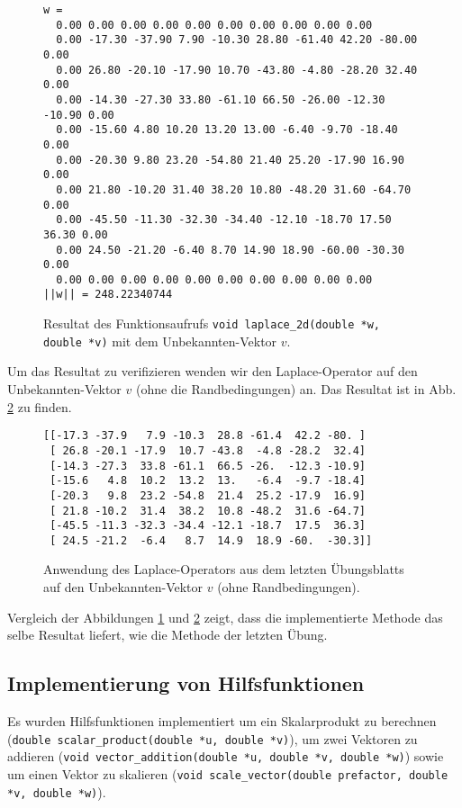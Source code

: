 \documentclass[10pt,a4paper]{article}
\begin{document}
\begin{figure}[H]
  \centering
\begin{verbatim}
w = 
  0.00 0.00 0.00 0.00 0.00 0.00 0.00 0.00 0.00 0.00 
  0.00 -17.30 -37.90 7.90 -10.30 28.80 -61.40 42.20 -80.00 0.00 
  0.00 26.80 -20.10 -17.90 10.70 -43.80 -4.80 -28.20 32.40 0.00 
  0.00 -14.30 -27.30 33.80 -61.10 66.50 -26.00 -12.30 -10.90 0.00 
  0.00 -15.60 4.80 10.20 13.20 13.00 -6.40 -9.70 -18.40 0.00 
  0.00 -20.30 9.80 23.20 -54.80 21.40 25.20 -17.90 16.90 0.00 
  0.00 21.80 -10.20 31.40 38.20 10.80 -48.20 31.60 -64.70 0.00 
  0.00 -45.50 -11.30 -32.30 -34.40 -12.10 -18.70 17.50 36.30 0.00 
  0.00 24.50 -21.20 -6.40 8.70 14.90 18.90 -60.00 -30.30 0.00 
  0.00 0.00 0.00 0.00 0.00 0.00 0.00 0.00 0.00 0.00 
||w|| = 248.22340744
\end{verbatim}
  \caption{Resultat des Funktionsaufrufs \texttt{void laplace\_2d(double *w,
  double *v)} mit dem Unbekannten-Vektor $v$.}
  \label{fig:w}
\end{figure}

Um das Resultat zu verifizieren wenden wir den Laplace-Operator auf den
Unbekannten-Vektor $v$ (ohne die Randbedingungen) an. Das Resultat ist in Abb.
\ref{fig:verify} zu finden.

\begin{figure}[H]
  \centering
\begin{verbatim}
[[-17.3 -37.9   7.9 -10.3  28.8 -61.4  42.2 -80. ]
 [ 26.8 -20.1 -17.9  10.7 -43.8  -4.8 -28.2  32.4]
 [-14.3 -27.3  33.8 -61.1  66.5 -26.  -12.3 -10.9]
 [-15.6   4.8  10.2  13.2  13.   -6.4  -9.7 -18.4]
 [-20.3   9.8  23.2 -54.8  21.4  25.2 -17.9  16.9]
 [ 21.8 -10.2  31.4  38.2  10.8 -48.2  31.6 -64.7]
 [-45.5 -11.3 -32.3 -34.4 -12.1 -18.7  17.5  36.3]
 [ 24.5 -21.2  -6.4   8.7  14.9  18.9 -60.  -30.3]]
\end{verbatim}
  \caption{Anwendung des Laplace-Operators aus dem letzten Übungsblatts auf den
    Unbekannten-Vektor $v$ (ohne Randbedingungen).}
  \label{fig:verify}
\end{figure}

Vergleich der Abbildungen \ref{fig:w} und \ref{fig:verify} zeigt, dass die
implementierte Methode das selbe Resultat liefert, wie die Methode der letzten
Übung.

\subsection{Implementierung von Hilfsfunktionen}

Es wurden Hilfsfunktionen implementiert um ein Skalarprodukt zu berechnen
(\texttt{double scalar\_product(double *u, double *v)}), um
zwei Vektoren zu addieren (\texttt{void vector\_addition(double *u, double *v,
  double *w)}) sowie um einen Vektor zu skalieren (\texttt{void
  scale\_vector(double prefactor, double *v, double *w)}).
\end{document}
